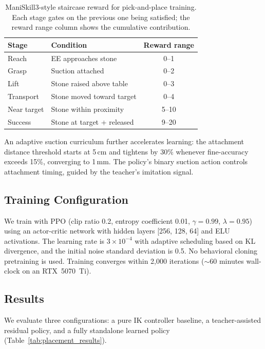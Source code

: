 \documentclass{article}
\begin{document}
\begin{table}[t]
\centering
\caption{ManiSkill3-style staircase reward for pick-and-place training. Each stage gates on the previous one being satisfied; the reward range column shows the cumulative contribution.}
\label{tab:rewards}
\small
\begin{tabular}{@{}llc@{}}
\toprule
\textbf{Stage} & \textbf{Condition} & \textbf{Reward range} \\
\midrule
Reach    & EE approaches stone & 0--1 \\
Grasp    & Suction attached     & 0--2 \\
Lift     & Stone raised above table & 0--3 \\
Transport & Stone moved toward target & 0--4 \\
Near target & Stone within proximity & 5--10 \\
Success  & Stone at target + released & 9--20 \\
\bottomrule
\end{tabular}
\end{table}

An adaptive suction curriculum further accelerates learning: the attachment distance threshold starts at 5\,cm and tightens by 30\% whenever fine-accuracy exceeds 15\%, converging to 1\,mm. The policy's binary suction action controls attachment timing, guided by the teacher's imitation signal.

\subsection{Training Configuration}

We train with PPO (clip ratio 0.2, entropy coefficient 0.01, $\gamma{=}0.99$, $\lambda{=}0.95$) using an actor-critic network with hidden layers [256, 128, 64] and ELU activations. The learning rate is $3{\times}10^{-4}$ with adaptive scheduling based on KL divergence, and the initial noise standard deviation is 0.5. No behavioral cloning pretraining is used. Training converges within 2{,}000 iterations (${\sim}$60 minutes wall-clock on an RTX~5070~Ti).

\subsection{Results}

We evaluate three configurations: a pure IK controller baseline, a teacher-assisted residual policy, and a fully standalone learned policy (Table~\ref{tab:placement_results}).
\end{document}
